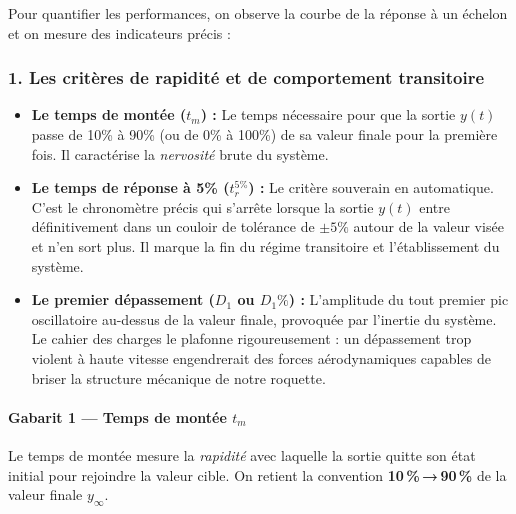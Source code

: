 \documentclass[11pt,a4paper]{report}
\begin{document}
Pour quantifier les performances, on observe la courbe de la réponse à un échelon et on mesure des indicateurs précis :

\subsubsection{1. Les critères de rapidité et de comportement transitoire}
\begin{itemize}
    \item \textbf{Le temps de montée ($t_m$) :} Le temps nécessaire pour que la sortie $y(t)$ passe de 10\% à 90\% (ou de 0\% à 100\%) de sa valeur finale pour la première fois. Il caractérise la \textit{nervosité} brute du système.
    \item \textbf{Le temps de réponse à 5\% ($t_r^{5\%}$) :} Le critère souverain en automatique. C'est le chronomètre précis qui s'arrête lorsque la sortie $y(t)$ entre définitivement dans un couloir de tolérance de $\pm 5\%$ autour de la valeur visée et n'en sort plus. Il marque la fin du régime transitoire et l'établissement du système.
    \item \textbf{Le premier dépassement ($D_1$ ou $D_1\%$) :} L'amplitude du tout premier pic oscillatoire au-dessus de la valeur finale, provoquée par l'inertie du système. Le cahier des charges le plafonne rigoureusement : un dépassement trop violent à haute vitesse engendrerait des forces aérodynamiques capables de briser la structure mécanique de notre roquette.
\end{itemize}


\paragraph{Gabarit 1 — Temps de montée $t_m$}
Le temps de montée mesure la \emph{rapidité} avec laquelle la sortie quitte son état initial pour rejoindre la valeur cible. On retient la convention \textbf{10\,\%\,→\,90\,\%} de la valeur finale $y_\infty$.
\end{document}

